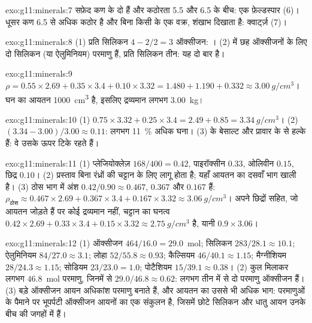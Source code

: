 \begin{solution}{exo:g11:minerals:7}
सफ़ेद कण के दो  हैं और कठोरता 5.5 और 6.5 के बीच: एक
फ़ेल्डस्पार (6)। धूसर कण 6.5 से अधिक कठोर है और बिना किसी  के एक वक्र,
शंखाभ  दिखाता है: क्वार्ट्ज़ (7)।
\end{solution}

\begin{solution}{exo:g11:minerals:8}
(1) प्रति सिलिकन $4 - 2/2 = 3$ ऑक्सीजन: । (2)  में
छह ऑक्सीजनों के लिए दो सिलिकन (या ऐलुमिनियम) परमाणु हैं, प्रति सिलिकन तीन: यह
दो बार  है।
\end{solution}

\begin{solution}{exo:g11:minerals:9}
$\rho = 0.55 \times 2.69 + 0.35 \times 3.4 + 0.10 \times 3.32 = 1.480 + 1.190
+ 0.332 \approx \qty{3.00}{g/cm^3}$। घन का आयतन
\qty{1000}{cm^3} है, इसलिए द्रव्यमान लगभग \qty{3.00}{kg}।
\end{solution}

\begin{solution}{exo:g11:minerals:10}
(1) $0.75 \times 3.32 + 0.25 \times 3.4 = 2.49 + 0.85 = \qty{3.34}{g/cm^3}$।
(2) $(3.34 - 3.00)/3.00 \approx 0.11$: लगभग \qty{11}{\percent} अधिक घना।
(3)  के बेसाल्ट और  प्रावार के  से
हल्के हैं: वे उसके ऊपर टिके रहते हैं।
\end{solution}

\begin{solution}{exo:g11:minerals:11}
(1) प्लेजियोक्लेज़ $168/400 = 0.42$, पाइरॉक्सीन $0.33$, ओलिवीन $0.15$, छिद्र
$0.10$। (2) प्रस्ताव बिना रंध्रों की चट्टान के लिए लागू होता है; यहाँ आयतन का
दसवाँ भाग खाली है। (3) ठोस भाग में अंश $0.42/0.90
\approx 0.467$, $0.367$ और $0.167$ हैं:
$\rho_{\text{ठोस}} \approx 0.467 \times 2.69 + 0.367 \times 3.4 + 0.167
\times 3.32 \approx \qty{3.06}{g/cm^3}$। अपने छिद्रों सहित, जो आयतन जोड़ते हैं
पर कोई द्रव्यमान नहीं, चट्टान का घनत्व $0.42 \times 2.69 + 0.33 \times 3.4 +
0.15 \times 3.32 \approx \qty{2.75}{g/cm^3}$ है, यानी $0.9 \times 3.06$।
\end{solution}

\begin{solution}{exo:g11:minerals:12}
(1) ऑक्सीजन $464/16.0 = 29.0$~mol; सिलिकन $283/28.1 \approx 10.1$; ऐलुमिनियम
$84/27.0 \approx 3.1$; लोहा $52/55.8 \approx 0.93$; कैल्सियम $46/40.1 \approx
1.15$; मैग्नीशियम $28/24.3 \approx 1.15$; सोडियम $23/23.0 = 1.0$; पोटैशियम
$15/39.1 \approx 0.38$। (2) कुल मिलाकर लगभग $46.8$~mol परमाणु, जिनमें से
$29.0/46.8 \approx 0.62$: लगभग तीन में से दो परमाणु ऑक्सीजन हैं।
(3) बड़े ऑक्सीजन आयन अधिकांश परमाणु बनाते हैं, और आयतन का उससे भी
अधिक भाग: परमाणुओं के पैमाने पर भूपर्पटी ऑक्सीजन आयनों का एक संकुलन है, जिसमें
छोटे सिलिकन और धातु आयन उनके बीच की जगहों में हैं।
\end{solution}

